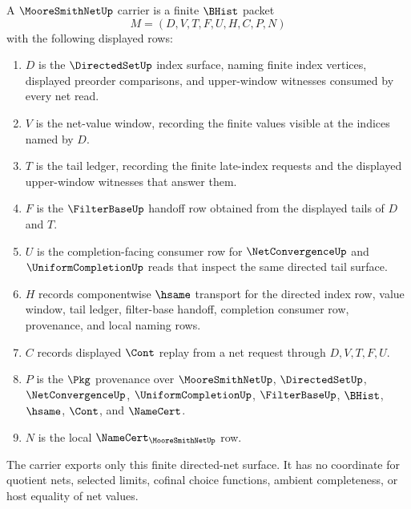\begin{definition}\label{def:moore-smith-net-carrier}
A $\MooreSmithNetUp$ carrier is a finite $\BHist$ packet
$$
M=(D,V,T,F,U,H,C,P,N)
$$
with the following displayed rows:
\begin{enumerate}
\item $D$ is the $\DirectedSetUp$ index surface, naming finite index vertices, displayed preorder comparisons, and upper-window witnesses consumed by every net read.
\item $V$ is the net-value window, recording the finite values visible at the indices named by $D$.
\item $T$ is the tail ledger, recording the finite late-index requests and the displayed upper-window witnesses that answer them.
\item $F$ is the $\FilterBaseUp$ handoff row obtained from the displayed tails of $D$ and $T$.
\item $U$ is the completion-facing consumer row for $\NetConvergenceUp$ and $\UniformCompletionUp$ reads that inspect the same directed tail surface.
\item $H$ records componentwise $\hsame$ transport for the directed index row, value window, tail ledger, filter-base handoff, completion consumer row, provenance, and local naming rows.
\item $C$ records displayed $\Cont$ replay from a net request through $D,V,T,F,U$.
\item $P$ is the $\Pkg$ provenance over $\MooreSmithNetUp$, $\DirectedSetUp$, $\NetConvergenceUp$, $\UniformCompletionUp$, $\FilterBaseUp$, $\BHist$, $\hsame$, $\Cont$, and $\NameCert$.
\item $N$ is the local $\NameCert_{\MooreSmithNetUp}$ row.
\end{enumerate}
The carrier exports only this finite directed-net surface. It has no coordinate for quotient nets, selected limits, cofinal choice functions, ambient completeness, or host equality of net values.
\end{definition}

